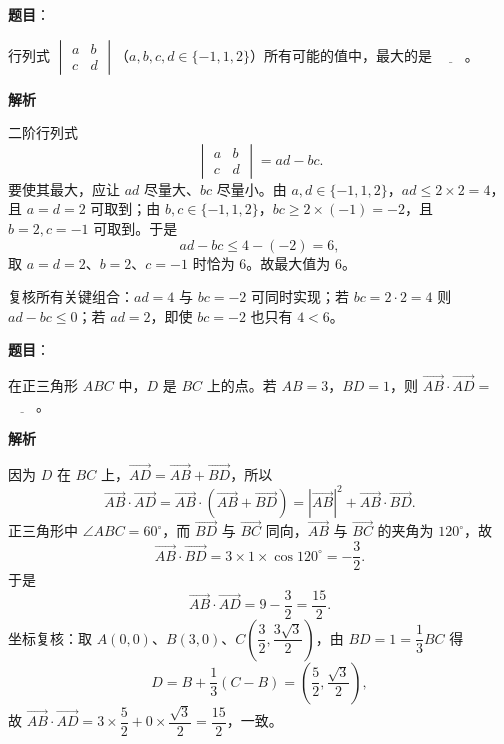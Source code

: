 \begin{answer}

\textbf{题目}：

行列式 $\begin{vmatrix}a&b\\c&d\end{vmatrix}$（$a,b,c,d\in\{-1,1,2\}$）所有可能的值中，最大的是 $\underline{\qquad}$。

\textbf{解析}

二阶行列式
\nopagebreak[4]
\[\begin{vmatrix}a&b\\c&d\end{vmatrix}=ad-bc.\]
要使其最大，应让 $ad$ 尽量大、$bc$ 尽量小。由 $a,d\in\{-1,1,2\}$，$ad\leqslant2\times2=4$，且 $a=d=2$ 可取到；由 $b,c\in\{-1,1,2\}$，$bc\geqslant2\times(-1)=-2$，且 $b=2,c=-1$ 可取到。于是
\nopagebreak[4]
\[ad-bc\leqslant4-(-2)=6,\]
取 $a=d=2$、$b=2$、$c=-1$ 时恰为 $6$。故最大值为 $6$。

复核所有关键组合：$ad=4$ 与 $bc=-2$ 可同时实现；若 $bc=2\cdot2=4$ 则 $ad-bc\leqslant0$；若 $ad=2$，即使 $bc=-2$ 也只有 $4<6$。


\end{answer}
\begin{answer}

\textbf{题目}：

在正三角形 $ABC$ 中，$D$ 是 $BC$ 上的点。若 $AB=3$，$BD=1$，则 $\overrightarrow{AB}\cdot\overrightarrow{AD}=$ $\underline{\qquad}$。

\textbf{解析}

因为 $D$ 在 $BC$ 上，$\overrightarrow{AD}=\overrightarrow{AB}+\overrightarrow{BD}$，所以
\nopagebreak[4]
\[\overrightarrow{AB}\cdot\overrightarrow{AD}=\overrightarrow{AB}\cdot\left(\overrightarrow{AB}+\overrightarrow{BD}\right)=|\overrightarrow{AB}|^2+\overrightarrow{AB}\cdot\overrightarrow{BD}.\]
正三角形中 $\angle ABC=60^\circ$，而 $\overrightarrow{BD}$ 与 $\overrightarrow{BC}$ 同向，$\overrightarrow{AB}$ 与 $\overrightarrow{BC}$ 的夹角为 $120^\circ$，故
\nopagebreak[4]
\[\overrightarrow{AB}\cdot\overrightarrow{BD}=3\times1\times\cos120^\circ=-\frac32.\]
于是
\nopagebreak[4]
\[\overrightarrow{AB}\cdot\overrightarrow{AD}=9-\frac32=\frac{15}{2}.\]
坐标复核：取 $A(0,0)$、$B(3,0)$、$C\left(\dfrac32,\dfrac{3\sqrt3}{2}\right)$，由 $BD=1=\dfrac13BC$ 得
\nopagebreak[4]
\[D=B+\frac13\left(C-B\right)=\left(\frac52,\frac{\sqrt3}{2}\right),\]
故 $\overrightarrow{AB}\cdot\overrightarrow{AD}=3\times\dfrac52+0\times\dfrac{\sqrt3}{2}=\dfrac{15}{2}$，一致。


\end{answer}
